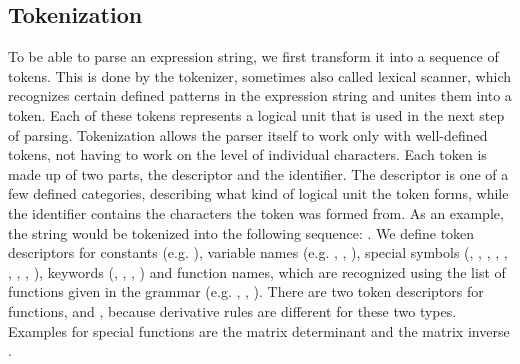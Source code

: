 \documentclass[12pt, a4paper]{report}
\begin{document}
\subsection{Tokenization}
To be able to parse an expression string, we first transform it into a sequence of tokens.
This is done by the tokenizer, sometimes also called lexical scanner, which recognizes certain defined patterns in the expression string and unites them into a token.
Each of these tokens represents a logical unit that is used in the next step of parsing.
Tokenization allows the parser itself to work only with well-defined tokens, not having to work on the level of individual characters.
Each token is made up of two parts, the descriptor and the identifier.
The descriptor is one of a few defined categories, describing what kind of logical unit the token forms, while the identifier contains the characters the token was formed from.
As an example, the string  would be tokenized into the following sequence: .
We define token descriptors for constants (e.g. ), variable names (e.g. , , ), special symbols (, , , , , , , , ), keywords (, , , ) and function names, which are recognized using the list of functions given in the grammar (e.g. , , ).
There are two token descriptors for functions,  and , because derivative rules are different for these two types.
Examples for special functions are the matrix determinant  and the matrix inverse .
\end{document}

